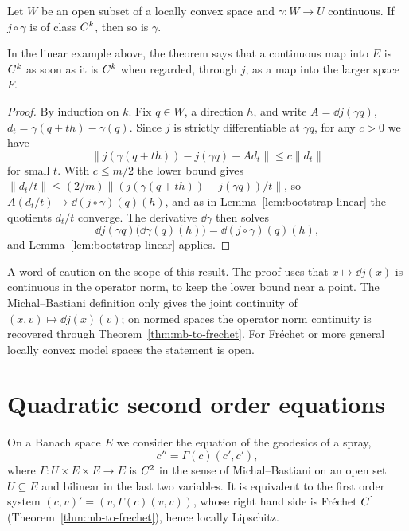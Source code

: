 \begin{theorem}
  \label{thm:bounded-below}
  \leanok
  Let $W$ be an open subset of a locally convex space and $\gamma \colon W \to U$ continuous. If
  $j \circ \gamma$ is of class $C^{k}$, then so is $\gamma$.
\end{theorem}

In the linear example above, the theorem says that a continuous map into $E$ is $C^{k}$ as soon
as it is $C^{k}$ when regarded, through $j$, as a map into the larger space $F$.

\begin{proof}
  \leanok
  By induction on $k$. Fix $q \in W$, a direction $h$, and write $A = \dd j(\gamma q)$,
  $d_t = \gamma(q + th) - \gamma(q)$. Since $j$ is strictly differentiable at $\gamma q$, for
  any $c > 0$ we have
  \[
    \|j(\gamma(q + th)) - j(\gamma q) - A d_t\| \le c \|d_t\|
  \]
  for small $t$. With $c \le m/2$ the lower bound gives
  $\|d_t / t\| \le (2/m) \|(j(\gamma(q+th)) - j(\gamma q))/t\|$, so
  $A(d_t/t) \to \dd(j\circ\gamma)(q)(h)$, and as in Lemma~\ref{lem:bootstrap-linear} the
  quotients $d_t/t$ converge. The derivative $\dd\gamma$ then solves
  \[
    \dd j(\gamma q)\bigl(\dd\gamma(q)(h)\bigr) = \dd(j \circ \gamma)(q)(h),
  \]
  and Lemma~\ref{lem:bootstrap-linear} applies.
\end{proof}

\begin{remark}
  A word of caution on the scope of this result. The proof uses that $x \mapsto \dd j(x)$ is
  continuous in the operator norm, to keep the lower bound near a point. The Michal--Bastiani
  definition only gives the joint continuity of $(x, v) \mapsto \dd j(x)(v)$; on normed spaces
  the operator norm continuity is recovered through Theorem~\ref{thm:mb-to-frechet}. For
  Fréchet or more general locally convex model spaces the statement is open.
\end{remark}

\section{Quadratic second order equations}

On a Banach space $E$ we consider the equation of the geodesics of a spray,
\[
  c'' = \Gamma(c)(c', c'),
\]
where $\Gamma \colon U \times E \times E \to E$ is $C^{2}$ in the sense of Michal--Bastiani on
an open set $U \subseteq E$ and bilinear in the last two variables. It is equivalent to the first
order system $(c, v)' = (v, \Gamma(c)(v, v))$, whose right hand side is Fr\'echet $C^{1}$
(Theorem~\ref{thm:mb-to-frechet}), hence locally Lipschitz.


